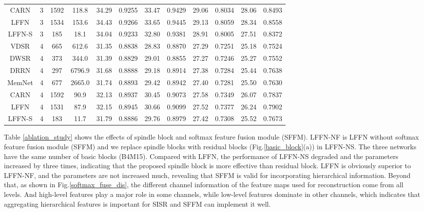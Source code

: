 \documentclass[journal]{IEEEtran}
\begin{document}
\begin{table*}[!ht]
\begin{tabular}{|c|c|c|c|cc|cc|cc|cc|}
CARN \cite{ahn2018fast}&3 & 1592 & 118.8 & 34.29& 0.9255&33.47& 0.9429& 29.06&0.8034& 28.06& 0.8493\\
LFFN &3 & 1534 & 153.6 &\color{red} 34.43&\color{red} 0.9266&\color{red} 33.65&\color{red} 0.9445&\color{red} 29.13& \color{red}0.8059&\color{red} 28.34&\color{red} 0.8558\\
LFFN-S & 3 & 185 & 18.1 & 34.04& 0.9233& 32.80&0.9381& 28.91& 0.8005& 27.51& 0.8372\\
\hline
\hline
VDSR \cite{Kim2016Accurate} & 4 & 665 & 612.6 & 31.35& 0.8838& 28.83& 0.8870&27.29& 0.7251& 25.18& 0.7524\\
DWSR \cite{guo2017deep}& 4 & 373 & 344.0 & 31.39& 0.8829& 29.01 & 0.8855 & 27.27& 0.7246& 25.27& 0.7552\\
DRRN \cite{tai2017image}& 4 & 297 & 6796.9 & 31.68& 0.8888&29.18& 0.8914& 27.38& 0.7284& 25.44& 0.7638\\
MemNet \cite{tai2017memnet} & 4 & 677 & 2665.0 & 31.74& 0.8893& 29.42& 0.8942& 27.40& 0.7281& 25.50& 0.7630\\
CARN \cite{ahn2018fast}&4 & 1592 & 90.9 & 32.13& 0.8937&30.45& 0.9073& 27.58&0.7349& 26.07& 0.7837\\
LFFN & 4 & 1531 & 87.9 &\color{red} 32.15&\color{red}0.8945& \color{red}30.66& \color{red} 0.9099&\color{red} 27.52&\color{red}0.7377&\color{red} 26.24& \color{red}0.7902\\
LFFN-S & 4 & 183 & 11.7 & 31.79& 0.8886& 29.76& 0.8979& 27.42& 0.7308& 25.52& 0.7673\\
\hline
\end{tabular}
\label{chart:Benchmark}
\end{table*}
Table \ref{ablation_study} shows the effects of spindle block and softmax feature fusion module (SFFM). LFFN-NF is LFFN without softmax feature fusion module (SFFM) and we replace spindle blocks with residual blocks (Fig.\ref{basic_block}(a)) in LFFN-NS. The three networks have the same number of basic blocks (B4M15). Compared with LFFN, the performance of LFFN-NS degraded and the parameters increased by three times, indicating that the proposed spindle block is more effective than residual block. LFFN is obviously superior to LFFN-NF, and the parameters are not increased much, revealing that SFFM is valid for incorporating hierarchical information. Beyond that, as shown in Fig.\ref{softmax_fuse_dis}, the different channel information of the feature maps used for reconstruction come from all levels. And high-level features play a major role in some channels, while low-level features dominate in other channels, which indicates that aggregating hierarchical features is important for SISR and SFFM can implement it well.
\end{document}
